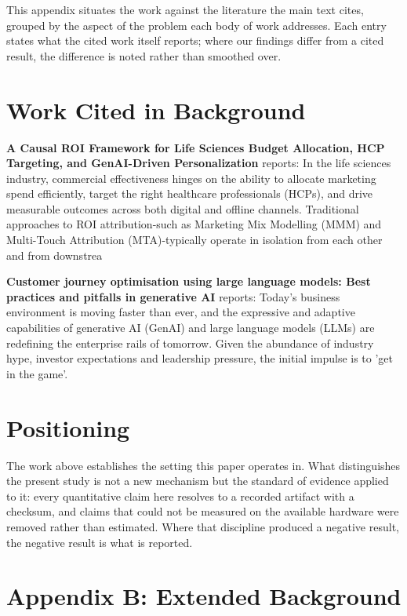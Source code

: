 \documentclass[10pt,journal,compsoc,twocolumn]{IEEEtran}
\begin{document}
This appendix situates the work against the literature the main text cites, grouped by the aspect of the problem each body of work addresses. Each entry states what the cited work itself reports; where our findings differ from a cited result, the difference is noted rather than smoothed over.


\section{Work Cited in Background}


\textbf{A Causal ROI Framework for Life Sciences Budget Allocation, HCP Targeting, and GenAI-Driven Personalization} \cite{crossref_10_2139_ssrn_6374778} reports: In the life sciences industry, commercial effectiveness hinges on the ability to allocate marketing spend efficiently, target the right healthcare professionals (HCPs), and drive measurable outcomes across both digital and offline channels. Traditional approaches to ROI attribution-such as Marketing Mix Modelling (MMM) and Multi-Touch Attribution (MTA)-typically operate in isolation from each other and from downstrea

\textbf{Customer journey optimisation using large language models: Best practices and pitfalls in generative AI} \cite{openalex_w4400993506} reports: Today's business environment is moving faster than ever, and the expressive and adaptive capabilities of generative AI (GenAI) and large language models (LLMs) are redefining the enterprise rails of tomorrow. Given the abundance of industry hype, investor expectations and leadership pressure, the initial impulse is to 'get in the game'.


\section{Positioning}


The work above establishes the setting this paper operates in. What distinguishes the present study is not a new mechanism but the standard of evidence applied to it: every quantitative claim here resolves to a recorded artifact with a checksum, and claims that could not be measured on the available hardware were removed rather than estimated. Where that discipline produced a negative result, the negative result is what is reported.




\section{Appendix B: Extended Background}
\end{document}
